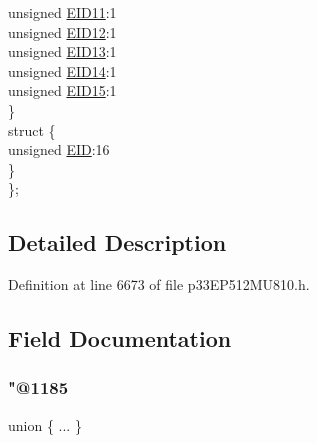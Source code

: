 \begin{DoxyCompactItemize}
\begin{tabbing}
\>\>unsigned \hyperlink{structtag_c2_r_x_f8_e_i_d_b_i_t_s_a710bdb0d602deb021b0be99066008018}{EID11}:1\\
\>\>unsigned \hyperlink{structtag_c2_r_x_f8_e_i_d_b_i_t_s_aa347bb85867bd8d4e0124f7cff8c6472}{EID12}:1\\
\>\>unsigned \hyperlink{structtag_c2_r_x_f8_e_i_d_b_i_t_s_a37d5f3edcbf6ef62f848fd4f3c584f79}{EID13}:1\\
\>\>unsigned \hyperlink{structtag_c2_r_x_f8_e_i_d_b_i_t_s_a7ffc0b0e0d99b8476b6f9a45337c17ab}{EID14}:1\\
\>\>unsigned \hyperlink{structtag_c2_r_x_f8_e_i_d_b_i_t_s_a293cd7dc1746257fa75a60cbd9383cd7}{EID15}:1\\
\>\} \\
\>struct \{\\
\>\>unsigned \hyperlink{structtag_c2_r_x_f8_e_i_d_b_i_t_s_ae80b378c9141f7c03e0b4e55b5f4b54d}{EID}:16\\
\>\} \\
\}; \\

\end{tabbing}\end{DoxyCompactItemize}


\subsection{Detailed Description}


Definition at line 6673 of file p33\+E\+P512\+M\+U810.\+h.



\subsection{Field Documentation}
\mbox{\label{structtag_c2_r_x_f8_e_i_d_b_i_t_s_a49d02ee58eb49909dd6f155089a66581}} 
\subsubsection{\texorpdfstring{"@1185}{@1185}}
{\footnotesize\ttfamily union \{ ... \} }

\mbox{\label{structtag_c2_r_x_f8_e_i_d_b_i_t_s_ae80b378c9141f7c03e0b4e55b5f4b54d}} 
